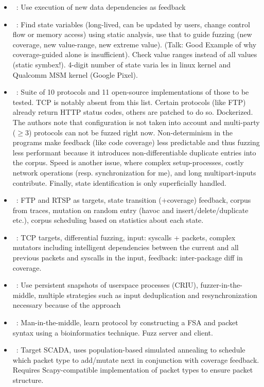 \documentclass{article}
\let\savedCite=\cite
\renewcommand{\cite}{\unskip~\savedCite}
\begin{document}
\begin{multicols}{2}
\begin{itemize}
    \item {}\cite{DDFuzz}: Use execution of new data dependencies as feedback
    \item {}\cite{StateFuzz}: Find state variables (long-lived, can be updated by users, change control flow or memory access) using static analysis, use that to guide fuzzing (new coverage, new value-range, new extreme value). (Talk: Good Example of why coverage-guided alone is insufficient). Check value ranges instead of all values (static symbex!). 4-digit number of state varia les in linux kernel and Qualcomm MSM kernel (Google Pixel).
    \item {}\cite{ProFuzzBench}: Suite of 10 protocols and 11 open-source implementations of those to be tested. TCP is notably absent from this list. Certain protocols (like FTP) already return HTTP status codes, others are patched to do so. Dockerized. The authors note that configuration is not taken into account and multi-party ($\geq 3$) protocols can not be fuzzed right now. Non-determinism in the programs make feedback (like code coverage) less predictable and thus fuzzing less performant because it introduces non-differentiable duplicate entries into the corpus. Speed is another issue, where complex setup-processes, costly network operations (resp. synchronization for me), and long multipart-inputs contribute. Finally, state identification is only superficially handled.
    \item {}\cite{AFLNET}: FTP and RTSP as targets, state transition (+coverage) feedback, corpus from traces, mutation on random entry (havoc and insert/delete/duplicate etc.), corpus scheduling based on statistics about each state.
    \item {}\cite{TCPFuzz}: TCP targets, differential fuzzing, input: syscalls + packets, complex mutators including intelligent dependencies between the current and all previous packets and syscalls in the input, feedback: inter-package diff in coverage.
    \item {}\cite{FitM}: Use persistent snapshots of userspace processes (CRIU), fuzzer-in-the-middle, multiple strategies such as input deduplication and resynchronization necessary because of the approach
    \item {}\cite{Autofuzz}: Man-in-the-middle, learn protocol by constructing a FSA and packet syntax using a bioinformatics technique. Fuzz server and client.
    \item {}\cite{EPF}: Target SCADA, uses population-based simulated annealing to schedule which packet type to add/mutate next in conjunction with coverage feedback. Requires Scapy-compatible implementation of packet types to ensure packet structure.

\end{itemize}
\end{multicols}
\end{document}
